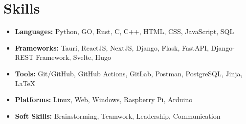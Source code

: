\documentclass[legalpaper,10.5pt]{article}
\begin{document}
\section{Skills}
\begin{itemize}[leftmargin=*]
    \item \textbf{Languages:} Python, GO, Rust, C, C++, HTML, CSS, JavaScript, SQL
    \item \textbf{Frameworks:} Tauri, ReactJS, NextJS, Django, Flask, FastAPI, Django-REST Framework, Svelte, Hugo
    \item \textbf{Tools:} Git/GitHub, GitHub Actions, GitLab, Postman, PostgreSQL, Jinja, LaTeX
    \item \textbf{Platforms:} Linux, Web, Windows, Raspberry Pi, Arduino
    \item \textbf{Soft Skills:} Brainstorming, Teamwork, Leadership, Communication
\end{itemize}

\end{document}
